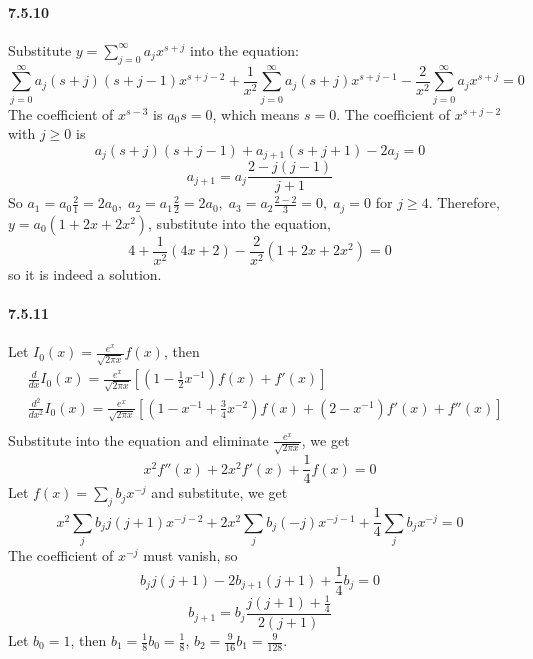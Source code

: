 \documentclass[a4paper]{article}
\begin{document}
\paragraph{7.5.10}
Substitute $y=\sum_{j=0}^\infty a_jx^{s+j}$ into the equation:
\[
\sum_{j=0}^\infty a_j(s+j)(s+j-1)x^{s+j-2}+\frac{1}{x^2}\sum_{j=0}^\infty a_j(s+j)x^{s+j-1}-\frac{2}{x^2}\sum_{j=0}^\infty a_jx^{s+j}=0
\]
The coefficient of $x^{s-3}$ is $a_0s=0$, which means $s=0$. The coefficient of $x^{s+j-2}$ with $j\geq0$ is 
\[
a_j(s+j)(s+j-1)+a_{j+1}(s+j+1)-2a_j=0
\]
\[
a_{j+1}=a_j\frac{2-j(j-1)}{j+1}
\]
So $a_1=a_0\frac{2}{1}=2a_0,\;a_2=a_1\frac{2}{2}=2a_0,\;a_3=a_2\frac{2-2}{3}=0,\;a_j=0$ for $j\geq4$. Therefore, $y=a_0(1+2x+2x^2)$, substitute into the equation,
\[
4+\frac{1}{x^2}(4x+2)-\frac{2}{x^2}(1+2x+2x^2)=0
\]
so it is indeed a solution.

\paragraph{7.5.11}
Let $I_0(x)=\frac{e^x}{\sqrt{2\pi x}}f(x)$, then 
\begin{align*}
    & \frac{d}{dx}I_0(x)=\frac{e^x}{\sqrt{2\pi x}}\left[(1-\frac{1}{2}x^{-1})f(x)+f'(x)\right]\\
    & \frac{d^2}{dx^2}I_0(x)=\frac{e^x}{\sqrt{2\pi x}}\left[(1-x^{-1}+\frac{3}{4}x^{-2})f(x)+(2-x^{-1})f'(x)+f''(x) \right]\\
\end{align*}
Substitute into the equation and eliminate $\frac{e^x}{\sqrt{2\pi x}}$, we get 
\[
x^2f''(x)+2x^2f'(x)+\frac{1}{4}f(x)=0
\]
Let $f(x)=\sum_j b_jx^{-j}$ and substitute, we get 
\[
x^2\sum_j b_j j(j+1)x^{-j-2}+2x^2\sum_j b_j(-j)x^{-j-1}+\frac{1}{4}\sum_j b_jx^{-j}=0
\]
The coefficient of $x^{-j}$ must vanish, so
\[
b_jj(j+1)-2b_{j+1}(j+1)+\frac{1}{4}b_j=0
\]
\[
b_{j+1}=b_j\frac{j(j+1)+\frac{1}{4}}{2(j+1)}
\]
Let $b_0=1$, then $b_1=\frac{1}{8}b_0=\frac{1}{8}$,\; $b_2=\frac{9}{16}b_1=\frac{9}{128}$.
\end{document}
